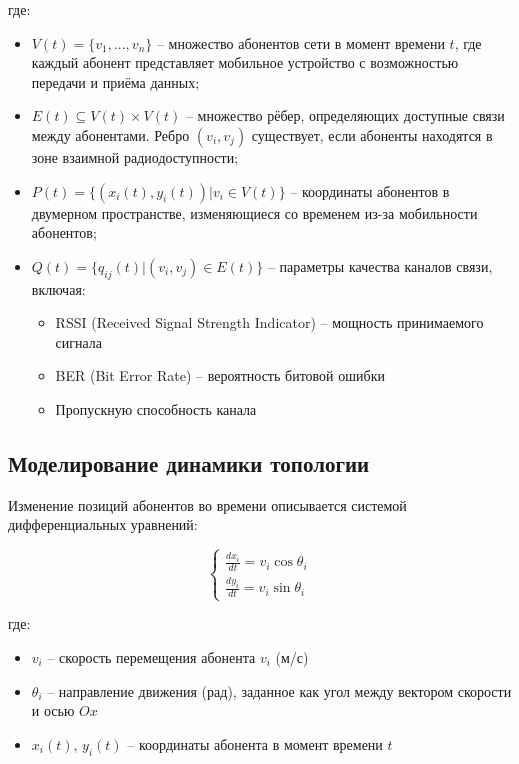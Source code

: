 где:
\begin{itemize}
    \item $V(t) = \{v_1, ..., v_n\}$ -- множество абонентов сети в момент времени $t$, где каждый абонент представляет мобильное устройство с 
    возможностью передачи и приёма данных;
    
    \item $E(t) \subseteq V(t) \times V(t)$ -- множество рёбер, определяющих доступные связи между абонентами. Ребро $(v_i, v_j)$ существует, если абоненты 
    находятся в зоне взаимной радиодоступности;
    
    \item $P(t) = \{(x_i(t), y_i(t)) | v_i \in V(t)\}$ -- координаты абонентов в двумерном пространстве, изменяющиеся со временем из-за мобильности абонентов;
    
    \item $Q(t) = \{q_{ij}(t) | (v_i,v_j) \in E(t)\}$ -- параметры качества каналов связи, включая:
    \begin{itemize}
        \item RSSI (Received Signal Strength Indicator) -- мощность принимаемого сигнала
        \item BER (Bit Error Rate) -- вероятность битовой ошибки
        \item Пропускную способность канала
    \end{itemize}
\end{itemize}

\subsection{Моделирование динамики топологии}

Изменение позиций абонентов во времени описывается системой дифференциальных уравнений:

\begin{equation}
\label{eq:motion_model}
\begin{cases}
\frac{dx_i}{dt} = v_i \cos \theta_i \\
\frac{dy_i}{dt} = v_i \sin \theta_i
\end{cases}
\end{equation}

где:
\begin{itemize}
    \item $v_i$ -- скорость перемещения абонента $v_i$ (м/с)
    \item $\theta_i$ -- направление движения (рад), заданное как угол между вектором скорости и осью $Ox$
    \item $x_i(t)$, $y_i(t)$ -- координаты абонента в момент времени $t$
\end{itemize}


